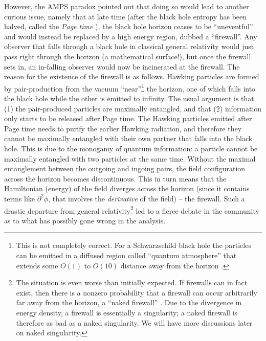 \documentclass[12pt,preprintnumbers, floatfix, preprintnumbers, letterpaper, superscriptaddress,nofootinbib]{revtex4-2}
\begin{document}
However, the AMPS paradox pointed out that doing so would lead to another curious issue, namely that at late time (after the black hole entropy has been halved, called the \emph{Page time} \cite{9305007,9306083,1301.4995}), the black hole horizon ceases to be ``uneventful'' and would instead be replaced by a high energy region, dubbed a ``firewall''. Any observer that falls through a black hole in classical general relativity would just pass right through the horizon (a mathematical surface!), but once the firewall sets in, an in-falling observer would now be incinerated at the firewall. The reason for the existence of the firewall is as follows. Hawking particles are formed by pair-production from the vacuum ``near''\footnote{This is not completely correct. For a Schwarzschild black hole the particles can be emitted in a diffused region called ``quantum atmosphere'' that extends some $O(1)$ to $O(10)$ distance away from the horizon \cite{1511.08221}.} the horizon, one of which falls into the black hole while the other is emitted to infinity. The usual argument is that (1) the pair-produced particles are maximally entangled, and that (2) information only starts to be released after Page time. The Hawking particles emitted after Page time needs to purify the earlier Hawking radiation, and therefore they cannot be maximally entangled with their own partner that falls into the black hole. This is due to the monogamy of quantum information: a particle cannot be maximally entangled with two particles at the same time. Without the maximal entanglement between the outgoing and ingoing pairs, the field configuration across the horizon becomes discontinuous. This in turn means that the Hamiltonian (energy) of the field diverges across the horizon (since it contains terms like $\partial^2\phi$, that involves the \emph{derivative} of the field) -- the firewall. Such a drastic departure from general relativity\footnote{The situation is even worse than initially expected. If firewalls can in fact exist, then there is a nonzero probability that a firewall can occur arbitrarily far away from the horizon, a ``naked firewall'' \cite{1511.05695}. Due to the divergence in energy density, a firewall is essentially a singularity; a naked firewall is therefore as bad as a naked singularity. We will have more discussions later on naked singularity.} led to a fierce debate in the community as to what has possibly gone wrong in the analysis. 
\end{document}
